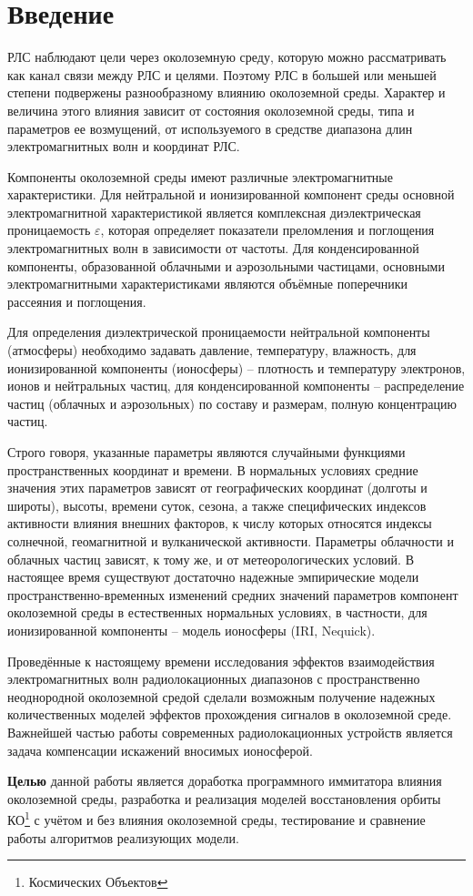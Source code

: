 \chapter*{Введение}							%

{
РЛС наблюдают цели через околоземную среду, которую можно рассматривать как канал связи между РЛС и целями. 
Поэтому РЛС в большей или меньшей степени подвержены разнообразному влиянию околоземной среды. Характер и
величина этого влияния зависит от состояния околоземной среды, типа и параметров ее возмущений, от используемого
в средстве диапазона длин электромагнитных волн и координат РЛС.

Компоненты околоземной среды имеют различные электромагнитные характеристики. Для нейтральной и ионизированной
компонент среды основной электромагнитной характеристикой является комплексная диэлектрическая проницаемость
$\varepsilon$, которая определяет показатели преломления и поглощения
электромагнитных волн в зависимости от частоты. Для конденсированной компоненты, образованной облачными и
аэрозольными частицами, основными электромагнитными характеристиками являются объёмные поперечники рассеяния и
поглощения.

Для определения диэлектрической проницаемости нейтральной компоненты (атмосферы) необходимо задавать давление,
температуру, влажность, для ионизированной компоненты (ионосферы) -- плотность и температуру электронов, ионов и
нейтральных частиц, для конденсированной компоненты -- распределение частиц (облачных и аэрозольных) по составу
и размерам, полную концентрацию частиц.

Строго говоря, указанные параметры являются случайными функциями пространственных координат и времени. 
В нормальных условиях средние значения этих параметров зависят от географических координат (долготы и широты),
высоты, времени суток, сезона, а также специфических индексов активности влияния внешних факторов, к числу
которых относятся индексы солнечной, геомагнитной и вулканической активности. Параметры облачности и облачных
частиц зависят, к тому же, и от метеорологических условий. В настоящее время существуют достаточно надежные 
эмпирические модели пространственно-временных изменений средних значений параметров компонент околоземной среды
в естественных нормальных условиях, в частности, для ионизированной компоненты -- модель ионосферы
(IRI, Nequick).

Проведённые к настоящему времени исследования эффектов взаимодействия электромагнитных волн радиолокационных
диапазонов с пространственно неоднородной околоземной средой сделали возможным получение надежных
количественных моделей эффектов прохождения сигналов в околоземной среде. Важнейшей частью работы современных 
радиолокационных устройств является задача компенсации искажений вносимых ионосферой.

\textbf{Целью} данной работы является доработка программного иммитатора влияния околоземной среды, разработка и
реализация моделей восстановления орбиты КО\footnote{Космических Объектов} с учётом и без влияния околоземной 
среды, тестирование и сравнение работы алгоритмов реализующих модели.

}

\clearpage